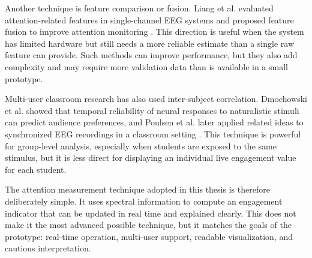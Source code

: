 Another technique is feature comparison or fusion. Liang et al. evaluated attention-related features in single-channel EEG systems and proposed feature fusion to improve attention monitoring \cite{Liang2022}. This direction is useful when the system has limited hardware but still needs a more reliable estimate than a single raw feature can provide. Such methods can improve performance, but they also add complexity and may require more validation data than is available in a small prototype.


Multi-user classroom research has also used inter-subject correlation. Dmochowski et al. showed that temporal reliability of neural responses to naturalistic stimuli can predict audience preferences, and Poulsen et al. later applied related ideas to synchronized EEG recordings in a classroom setting \cite{Dmochowski2014,Poulsen2017}. This technique is powerful for group-level analysis, especially when students are exposed to the same stimulus, but it is less direct for displaying an individual live engagement value for each student.


The attention measurement technique adopted in this thesis is therefore deliberately simple. It uses spectral information to compute an engagement indicator that can be updated in real time and explained clearly. This does not make it the most advanced possible technique, but it matches the goals of the prototype: real-time operation, multi-user support, readable visualization, and cautious interpretation.
